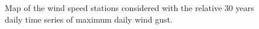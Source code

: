 \documentclass[preprint,12pt]{elsarticle}
\begin{document}
\begin{figure}[!h]
\captionsetup[subfigure]{labelformat=empty}
 \quad
\caption{Map of the wind speed stations considered with the relative 30 years daily time series of maximum daily wind gust.}
\label{figure:Ireland}
\end{figure}


\clearpage
\begin{thebibliography}{99}
\end{thebibliography}
\end{document}
